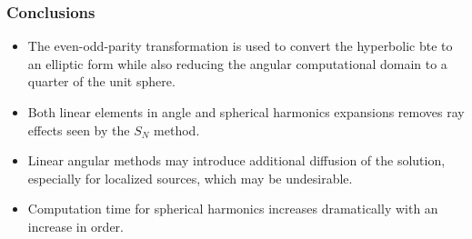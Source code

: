 \begin{frame}
      \frametitle{Conclusions}
      \begin{itemize}
            \item The even-odd-parity transformation is used to convert the hyperbolic \gls{bte} to an elliptic form while also reducing the angular computational domain to a quarter of the unit sphere.
            \item Both linear elements in angle and spherical harmonics expansions removes ray effects seen by the $S_N$ method.
            \item Linear angular methods may introduce additional diffusion of the solution, especially for localized sources, which may be undesirable.
            \item Computation time for spherical harmonics increases dramatically with an increase in order.
      \end{itemize}
\end{frame}
